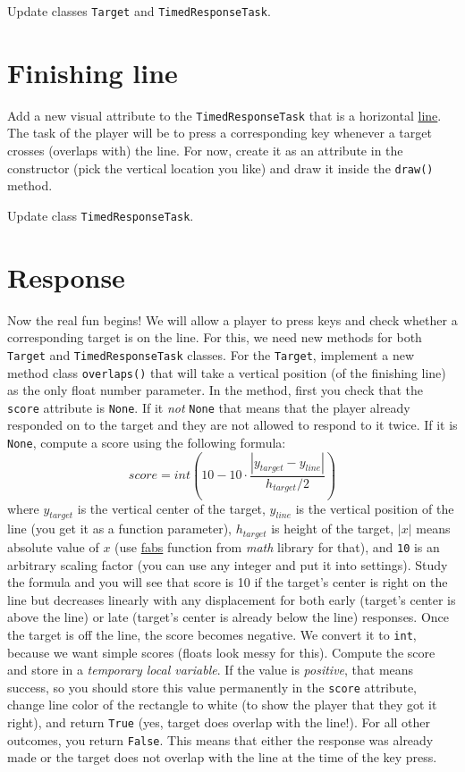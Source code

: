 \documentclass[
]{book}
\begin{document}
Update classes \texttt{Target} and \texttt{TimedResponseTask}.

\hypertarget{finishing-line}{%
\section{Finishing line}\label{finishing-line}}

Add a new visual attribute to the \texttt{TimedResponseTask} that is a horizontal \href{https://psychopy.org/api/visual/line.html\#psychopy.visual.Line}{line}. The task of the player will be to press a corresponding key whenever a target crosses (overlaps with) the line. For now, create it as an attribute in the constructor (pick the vertical location you like) and draw it inside the \texttt{draw()} method.

Update class \texttt{TimedResponseTask}.

\hypertarget{response}{%
\section{Response}\label{response}}

Now the real fun begins! We will allow a player to press keys and check whether a corresponding target is on the line. For this, we need new methods for both \texttt{Target} and \texttt{TimedResponseTask} classes. For the \texttt{Target}, implement a new method class \texttt{overlaps()} that will take a vertical position (of the finishing line) as the only float number parameter. In the method, first you check that the \texttt{score} attribute is \texttt{None}. If it \emph{not} \texttt{None} that means that the player already responded on to the target and they are not allowed to respond to it twice. If it is \texttt{None}, compute a score using the following formula:
\[score = int \left(10 - 10 \cdot \frac{|y_{target} - y_{line}|}{h_{target} / 2} \right)\]
where \(y_{target}\) is the vertical center of the target, \(y_{line}\) is the vertical position of the line (you get it as a function parameter), \(h_{target}\) is height of the target, \(|x|\) means absolute value of \(x\) (use \href{https://docs.python.org/3/library/math.html\#math.fabs}{fabs} function from \emph{math} library for that), and \texttt{10} is an arbitrary scaling factor (you can use any integer and put it into settings). Study the formula and you will see that score is 10 if the target's center is right on the line but decreases linearly with any displacement for both early (target's center is above the line) or late (target's center is already below the line) responses. Once the target is off the line, the score becomes negative. We convert it to \texttt{int}, because we want simple scores (floats look messy for this). Compute the score and store in a \emph{temporary local variable}. If the value is \emph{positive}, that means success, so you should store this value permanently in the \texttt{score} attribute, change line color of the rectangle to white (to show the player that they got it right), and return \texttt{True} (yes, target does overlap with the line!). For all other outcomes, you return \texttt{False}. This means that either the response was already made or the target does not overlap with the line at the time of the key press.
\end{document}

